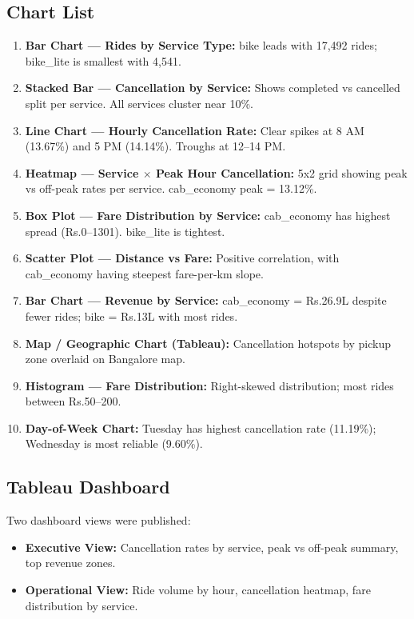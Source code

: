 \documentclass[12pt,a4paper]{article}
\begin{document}
\subsection{Chart List}
\begin{enumerate}
  \item \textbf{Bar Chart --- Rides by Service Type:} bike leads with 17,492 rides; bike\_lite is smallest with 4,541.
  \item \textbf{Stacked Bar --- Cancellation by Service:} Shows completed vs cancelled split per service. All services cluster near 10\%.
  \item \textbf{Line Chart --- Hourly Cancellation Rate:} Clear spikes at 8 AM (13.67\%) and 5 PM (14.14\%). Troughs at 12--14 PM.
  \item \textbf{Heatmap --- Service $\times$ Peak Hour Cancellation:} 5x2 grid showing peak vs off-peak rates per service. cab\_economy peak = 13.12\%.
  \item \textbf{Box Plot --- Fare Distribution by Service:} cab\_economy has highest spread (Rs.0--1301). bike\_lite is tightest.
  \item \textbf{Scatter Plot --- Distance vs Fare:} Positive correlation, with cab\_economy having steepest fare-per-km slope.
  \item \textbf{Bar Chart --- Revenue by Service:} cab\_economy = Rs.26.9L despite fewer rides; bike = Rs.13L with most rides.
  \item \textbf{Map / Geographic Chart (Tableau):} Cancellation hotspots by pickup zone overlaid on Bangalore map.
  \item \textbf{Histogram --- Fare Distribution:} Right-skewed distribution; most rides between Rs.50--200.
  \item \textbf{Day-of-Week Chart:} Tuesday has highest cancellation rate (11.19\%); Wednesday is most reliable (9.60\%).
\end{enumerate}

\subsection{Tableau Dashboard}
Two dashboard views were published:
\begin{itemize}
  \item \textbf{Executive View:} Cancellation rates by service, peak vs off-peak summary, top revenue zones.
  \item \textbf{Operational View:} Ride volume by hour, cancellation heatmap, fare distribution by service.
\end{itemize}
\end{document}
